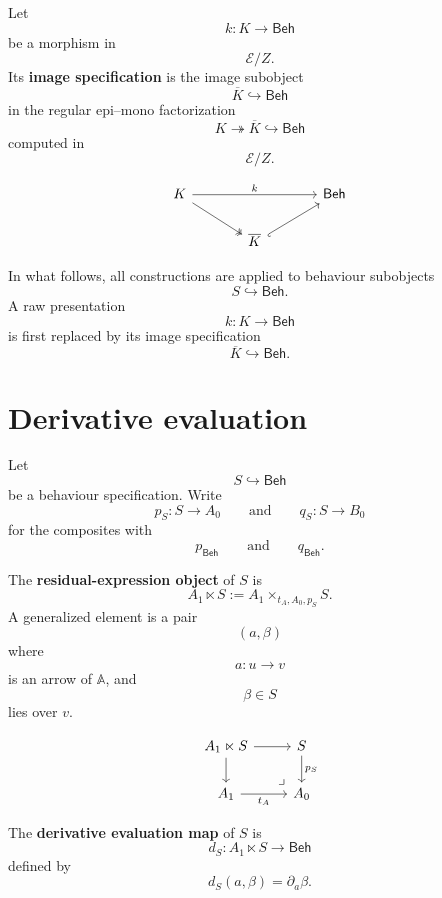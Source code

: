 \begin{definition}
\label{def:image-specification}
Let
\[
k:K\to\mathsf{Beh}
\]
be a morphism in
\[
\mathcal E/Z.
\]
Its \textbf{image specification} is the image subobject
\[
\overline K\hookrightarrow\mathsf{Beh}
\]
in the regular epi--mono factorization
\[
K\twoheadrightarrow \overline K\hookrightarrow \mathsf{Beh}
\]
computed in
\[
\mathcal E/Z.
\]
\end{definition}

\[
\begin{tikzcd}[column sep=large]
K
\arrow[rr, "k"]
\arrow[dr, two heads]
&&
\mathsf{Beh}
\\
&
\overline K
\arrow[ur, hook']
&
\end{tikzcd}
\]

In what follows, all constructions are applied to behaviour subobjects
\[
S\hookrightarrow\mathsf{Beh}.
\]
A raw presentation
\[
k:K\to\mathsf{Beh}
\]
is first replaced by its image specification
\[
\overline K\hookrightarrow\mathsf{Beh}.
\]

\section{Derivative evaluation}
\label{sec:derivative-evaluation}

Let
\[
S\hookrightarrow\mathsf{Beh}
\]
be a behaviour specification. Write
\[
p_S:S\to A_0
\qquad\text{and}\qquad
q_S:S\to B_0
\]
for the composites with
\[
p_{\mathsf{Beh}}
\qquad\text{and}\qquad
q_{\mathsf{Beh}}.
\]

\begin{definition}
\label{def:residual-expression-object-over-specification}
The \textbf{residual-expression object} of \(S\) is
\[
A_1\ltimes S
:=
A_1\times_{t_A,A_0,p_S}S.
\]
A generalized element is a pair
\[
(a,\beta)
\]
where
\[
a:u\to v
\]
is an arrow of \(\mathbb A\), and
\[
\beta\in S
\]
lies over \(v\).
\end{definition}

\[
\begin{tikzcd}
A_1\ltimes S
\arrow[r]
\arrow[d]
&
S
\arrow[d, "p_S"]
\\
A_1
\arrow[r, "t_A"']
&
A_0
\arrow[ul, phantom, "\lrcorner", very near start]
\end{tikzcd}
\]

\begin{definition}
\label{def:derivative-evaluation}
The \textbf{derivative evaluation map} of \(S\) is
\[
d_S:
A_1\ltimes S\to \mathsf{Beh}
\]
defined by
\[
d_S(a,\beta)=\partial_a\beta.
\]
\end{definition}

